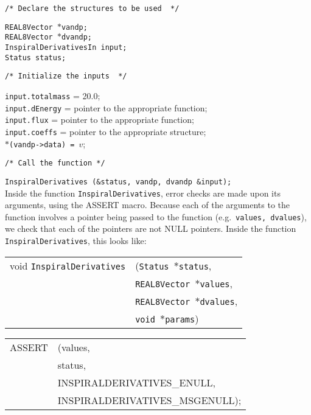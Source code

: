 \documentclass[12pt]{article}
\begin{document}
\noindent
\begin{verbatim}
/* Declare the structures to be used  */
\end{verbatim}
\texttt{REAL8Vector $\ast$vandp;} \\
\texttt{REAL8Vector $\ast$dvandp;} \\
\texttt{InspiralDerivativesIn input;} \\
\texttt{Status status;} \\
\begin{verbatim}
/* Initialize the inputs  */
\end{verbatim}
\texttt{input.totalmass} = 20.0; \\
\texttt{input.dEnergy} = pointer to the appropriate function; \\
\texttt{input.flux} = pointer to the appropriate function; \\
\texttt{input.coeffs} = pointer to the appropriate structure; \\
\texttt{$\ast$(vandp->data) = $v$}; \\
\begin{verbatim}
/* Call the function */
\end{verbatim}
\texttt{InspiralDerivatives (\&status, vandp, dvandp \&input);} \\

Inside the function \texttt{InspiralDerivatives}, error checks are made upon its arguments, using the ASSERT macro. Because each of the arguments to the function involves a pointer being passed to the function (e.g.\ \texttt{values, dvalues}), we check that each of the pointers are not NULL pointers.
Inside the function \texttt{InspiralDerivatives}, this looks like:

\vspace{5mm}

\begin{tabular}{ll}
void \texttt{InspiralDerivatives}&(\texttt{Status $\ast$status},     \\
                                   &\texttt{REAL8Vector $\ast$values}, \\
                                   &\texttt{REAL8Vector $\ast$dvalues}, \\
                                   &\texttt{void $\ast$params})
\end{tabular}

\vspace{5mm}

\begin{tabular}{ll}
ASSERT & (values,  \\
       &  status,    \\
       &  INSPIRALDERIVATIVES\_ENULL, \\
       &  INSPIRALDERIVATIVES\_MSGENULL);
\end{tabular}
\end{document}
